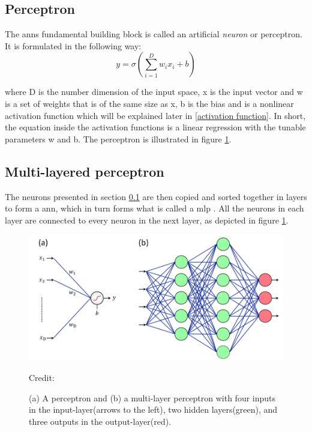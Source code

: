     \subsection{Perceptron} \label{perceptron}
        The \gls{ann}s fundamental building block is called an artificial \textit{neuron} or perceptron. It is formulated in the following way\cite{razavi2021deep_exp_per}:
            \begin{equation} \label{eq_perceptron}
                y = \sigma(\sum_{i=1}^{D}w_ix_i + b)
            \end{equation}
            
        where D is the number dimension of the input space, x is the input vector and w is a set of weights that is of the same size as x, b is the bias and {\textsigma} is a nonlinear activation function which will be explained later in \ref{activation function}. In short, the equation inside the activation functions is a linear regression with the tunable parameters w and b. The perceptron is illustrated in figure \ref{Perceptron / MLP}.
    
    \subsection{Multi-layered perceptron} \label{MLP}
        The neurons presented in section \ref{perceptron} are then copied and sorted together in layers to form a \gls{ann}, which in turn forms what is called a \gls{mlp} \cite{razavi2021deep_exp_per}. All the neurons in each layer are connected to every neuron in the next layer, as depicted in figure \ref{Perceptron / MLP}.
        
            \begin{figure}[H]
                \centering
                \includegraphics[scale=0.5]{figures/perceptron.png}
                \caption[The perceptron and multi-layer perceptron]{(a) A perceptron and (b) a multi-layer perceptron with four inputs in the input-layer(arrows to the left), two hidden layers(green), and three outputs in the output-layer(red).}
              	\medskip 
                \hspace*{15pt}\hbox{\scriptsize Credit: \citeauthor{razavi2021deep_exp_DL}\cite{razavi2021deep_exp_DL}}
                \label{Perceptron / MLP}
            \end{figure}
        
